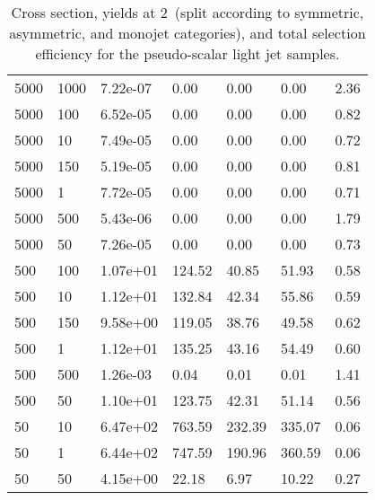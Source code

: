 \begin{table}
\begin{tabular}{lllllll}
5000      &   1000      &   7.22e-07  &   0.00      &   0.00      &   0.00      &   2.36      \\ 
5000      &   100       &   6.52e-05  &   0.00      &   0.00      &   0.00      &   0.82      \\ 
5000      &   10        &   7.49e-05  &   0.00      &   0.00      &   0.00      &   0.72      \\ 
5000      &   150       &   5.19e-05  &   0.00      &   0.00      &   0.00      &   0.81      \\ 
5000      &   1         &   7.72e-05  &   0.00      &   0.00      &   0.00      &   0.71      \\ 
5000      &   500       &   5.43e-06  &   0.00      &   0.00      &   0.00      &   1.79      \\ 
5000      &   50        &   7.26e-05  &   0.00      &   0.00      &   0.00      &   0.73      \\ 
500       &   100       &   1.07e+01  &   124.52    &   40.85     &   51.93     &   0.58      \\ 
500       &   10        &   1.12e+01  &   132.84    &   42.34     &   55.86     &   0.59      \\ 
500       &   150       &   9.58e+00  &   119.05    &   38.76     &   49.58     &   0.62      \\ 
500       &   1         &   1.12e+01  &   135.25    &   43.16     &   54.49     &   0.60      \\ 
500       &   500       &   1.26e-03  &   0.04      &   0.01      &   0.01      &   1.41      \\ 
500       &   50        &   1.10e+01  &   123.75    &   42.31     &   51.14     &   0.56      \\ 
50        &   10        &   6.47e+02  &   763.59    &   232.39    &   335.07    &   0.06      \\ 
50        &   1         &   6.44e+02  &   747.59    &   190.96    &   360.59    &   0.06      \\ 
50        &   50        &   4.15e+00  &   22.18     &   6.97      &   10.22     &   0.27      \\ 
\hline
\end{tabular}
\caption{Cross section, yields at 2~\ifb (split according to symmetric, asymmetric, and monojet categories), and total selection efficiency for the pseudo-scalar light jet samples.}
\label{tab:dm_P_g1_2fb}
\end{table}
